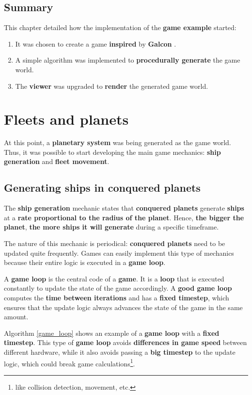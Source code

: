 \documentclass[a4paper,11pt,titlepage,abstract,numbers=noenddot,automark,mnsy,intlimits,rgb,dvipsnames]{report}
\begin{document}
\section{Summary}
This chapter detailed how the implementation of the \textbf{game example} started:
\begin{enumerate}
\item
It was chosen to create a game \textbf{inspired} by \textbf{Galcon} \cite{galcon}.
\item
A simple algorithm was implemented to \textbf{procedurally generate} the game world.
\item
The \textbf{viewer} was upgraded to \textbf{render} the generated game world.
\end{enumerate}
\chapter{Fleets and planets}
\label{fleets_planets}
At this point, a \textbf{planetary system} was being generated as the game world. Thus, it was possible to start developing 
the main game mechanics: \textbf{ship generation} and \textbf{fleet movement}.
\section{Generating ships in conquered planets}
The \textbf{ship generation} mechanic states that \textbf{conquered planets} generate \textbf{ships} at a \textbf{rate proportional to the
radius of the planet}. Hence, \textbf{the bigger the planet}, \textbf{the more ships it will generate} during a specific timeframe.

The nature of this mechanic is periodical: \textbf{conquered planets} need to be updated quite frequently. Games can easily
implement this type of mechanics because their entire logic is executed in a \textbf{game loop}.

A \textbf{game loop} is the central code of a \textbf{game}. It is a \textbf{loop} that is executed constantly to update the state of
the game accordingly. A \textbf{good game loop} computes the \textbf{time between iterations} and has a \textbf{fixed timestep}, which ensures
that the update logic always advances the state of the game in the same amount.

Algorithm \autoref{game_loop} shows an example of a \textbf{game loop} with a \textbf{fixed timestep}. This type of \textbf{game loop}
avoids \textbf{differences in game speed} between different hardware, while it also avoids passing a \textbf{big timestep} to the
update logic, which could break game calculations\footnote{like collision detection, movement, etc.}.
\end{document}
